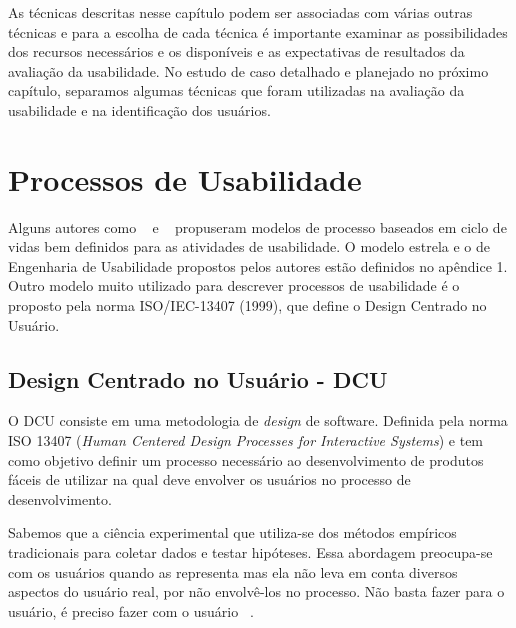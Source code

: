 As técnicas descritas nesse capítulo podem ser associadas com várias outras técnicas e para a escolha de cada técnica é importante examinar as possibilidades dos recursos necessários e os disponíveis e as expectativas de resultados da avaliação da usabilidade. 
%
No estudo de caso detalhado e planejado no próximo capítulo, separamos algumas técnicas que foram utilizadas na avaliação da usabilidade e na identificação dos usuários. 


%



\section{Processos de Usabilidade}


	Alguns autores como ~ e ~ propuseram modelos de processo baseados em ciclo de vidas bem definidos para as atividades de usabilidade. O modelo estrela e o de Engenharia de Usabilidade propostos pelos autores estão definidos no apêndice 1. 
	Outro modelo muito utilizado para descrever processos de usabilidade é o proposto pela norma ISO/IEC-13407 (1999), que define o Design Centrado no Usuário.


\subsection{Design Centrado no Usuário - DCU}

O DCU consiste em uma metodologia de \emph{design} de software. Definida pela norma ISO 13407 (\textit{Human Centered Design Processes for Interactive Systems}) e tem como objetivo definir um processo necessário ao desenvolvimento de produtos fáceis de utilizar na qual deve envolver os usuários no processo de desenvolvimento.

Sabemos que a ciência experimental que utiliza-se dos métodos empíricos tradicionais para coletar dados e testar hipóteses. Essa abordagem preocupa-se com os usuários quando as representa mas ela não leva em conta diversos aspectos do usuário real, por não envolvê-los no processo. Não basta fazer para o usuário, é preciso fazer com o usuário ~\cite{eason1995}. 

